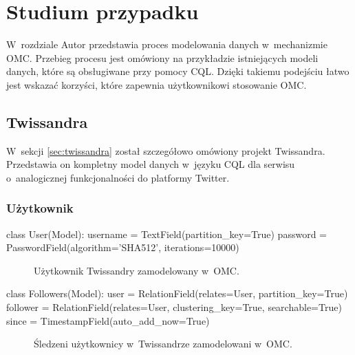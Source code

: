 
\chapter{Studium przypadku}
\label{chap:case_study}

W~rozdziale Autor przedstawia proces modelowania danych w~mechanizmie OMC. Przebieg procesu jest omówiony na przykładzie istniejących modeli danych, które są obsługiwane przy pomocy CQL. Dzięki takiemu podejściu łatwo jest wskazać korzyści, które zapewnia użytkownikowi stosowanie OMC.

\section{Twissandra}
\label{sec:case_study_twissandra}

W~sekcji \ref{sec:twissandra} został szczegółowo omówiony projekt Twissandra. Przedstawia on kompletny model danych w~języku CQL dla serwisu o~analogicznej funkcjonalności do platformy Twitter. 

\subsection{Użytkownik}

\begin{verbbox}
	class User(Model):
	    username = TextField(partition_key=True)
	    password = PasswordField(algorithm='SHA512', 
	                             iterations=10000)
\end{verbbox}

\begin{figure}[ht!]
	\centering
	\theverbbox
	\caption{Użytkownik Twissandry zamodelowany w~OMC.}
	\label{vrb:omc_twissandra_user}
\end{figure}

\begin{verbbox}
	class Followers(Model):
	    user = RelationField(relates=User, 
	                         partition_key=True)
	    follower = RelationField(relates=User,
	                             clustering_key=True,
	                             searchable=True)
	    since = TimestampField(auto_add_now=True)
\end{verbbox}

\begin{figure}[ht!]
	\centering
	\theverbbox
	\caption{Śledzeni użytkownicy w~Twissandrze zamodelowani w~OMC.}
	\label{vrb:omc_twissandra_followers}
\end{figure}

